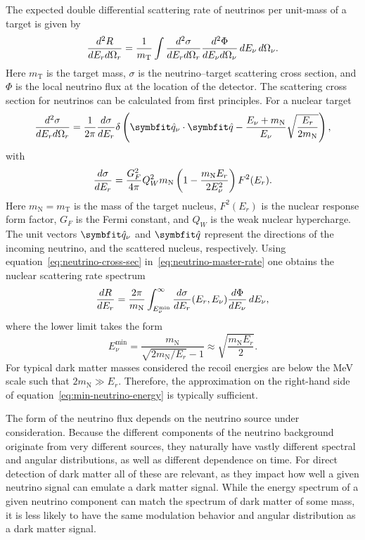 The expected double differential scattering rate of neutrinos per unit-mass of a target is given by
\begin{equation}
    \frac{d^2R}{dE_rd\Omega_r}=\frac{1}{m_\text{T}}\int\frac{d^2\sigma}{dE_rd\Omega_r}\frac{d^2\Phi}{dE_\nu d\Omega_\nu}\,d E_\nu\,d\Omega_\nu.
    \label{eq:neutrino-master-rate}
\end{equation}
Here $m_\text{T}$ is the target mass, $\sigma$ is the neutrino--target scattering cross section, and $\Phi$ is the local neutrino flux at the location of the detector. The scattering cross section for neutrinos can be calculated from first principles. For a nuclear target
\begin{equation}
    \ddder{\sigma}{E_r}{\Omega_r}=\frac{1}{2\pi}\der{\sigma}{E_r}\delta\left(\unitv{q}_\nu\cdot\unitv{q}-\frac{E_\nu+m_\text{N}}{E_\nu}\sqrt{\frac{E_r}{2m_\text{N}}}\right),
    \label{eq:neutrino-cross-sec}
\end{equation}
with
\begin{equation}
    \frac{d\sigma}{dE_r}=\frac{G_F^2}{4\pi}Q_W^2m_\text{N}\left(1-\frac{m_\text{N}E_r}{2E_\nu^2}\right)F^2(E_r).
\end{equation}
Here $m_\text{N}=m_\text{T}$ is the mass of the target nucleus, $F^2(E_r)$ is the nuclear response form factor, $G_F$ is the Fermi constant, and $Q_W$ is the weak nuclear hypercharge. The unit vectors $\unitv{q}_\nu$ and $\unitv{q}$ represent the directions of the incoming neutrino, and the scattered nucleus, respectively. Using equation~\eqref{eq:neutrino-cross-sec} in~\eqref{eq:neutrino-master-rate} one obtains the nuclear scattering rate spectrum
\begin{equation}
    \frac{dR}{dE_r}=\frac{2\pi}{m_\text{N}}\int_{E_\nu^\text{min}}^\infty\frac{d\sigma}{dE_r}(E_r,E_\nu)\frac{d\Phi}{dE_\nu}\,d E_\nu,
\end{equation}
where the lower limit takes the form
\begin{equation}
    E_\nu^\text{min}=\frac{m_\text{N}}{\sqrt{2m_\text{N}/E_r}-1}\approx\sqrt{\frac{m_\text{N}E_r}{2}}.
    \label{eq:min-neutrino-energy}
\end{equation}
For typical dark matter masses considered the recoil energies are below the MeV scale such that $2m_\text{N}\gg E_r$. Therefore, the approximation on the right-hand side of equation~\eqref{eq:min-neutrino-energy} is typically sufficient.

The form of the neutrino flux depends on the neutrino source under consideration. Because the different components of the neutrino background originate from very different sources, they naturally have vastly different spectral and angular distributions, as well as different dependence on time. For direct detection of dark matter all of these are relevant, as they impact how well a given neutrino signal can emulate a dark matter signal. While the energy spectrum of a given neutrino component can match the spectrum of dark matter of some mass, it is less likely to have the same modulation behavior and angular distribution as a dark matter signal.

